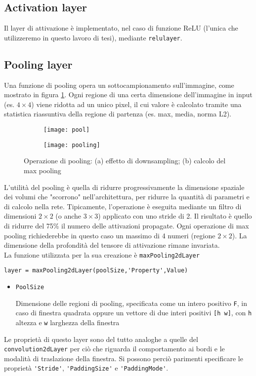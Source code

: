 \subsection{Activation layer}
\label{RELU}
Il layer di attivazione è implementato, nel caso di funzione ReLU (l'unica che utilizzeremo in questo lavoro di tesi), mediante \verb|relulayer|.

\subsection{Pooling layer}
\label{POOL}
Una funzione di pooling opera un sottocampionamento sull'immagine, come mostrato in figura \ref{fig:pooling}.  Ogni regione di una certa dimensione dell'immagine in input (es. $4\times4$) viene ridotta ad un unico pixel, il cui valore è calcolato tramite una statistica riassuntiva della regione di partenza (es. max, media, norma L2).
\begin{figure}[h!]
\centering
\begin{subfigure}[b]{0.48\textwidth}
\centering
\texttt{[image: pool]}
\caption{}
\end{subfigure}

\begin{subfigure}[b]{0.48\textwidth}
\centering
\texttt{[image: pooling]}
\caption{}
\end{subfigure}
\caption{Operazione di pooling: (a) effetto di downsampling; (b) calcolo del max pooling}
\label{fig:pooling}
\end{figure}

L'utilità del pooling è quella di ridurre progressivamente la dimensione spaziale dei volumi che "scorrono" nell'architettura, per ridurre la quantità di parametri e di calcolo nella rete. Tipicamente, l'operazione è eseguita mediante un filtro di dimensioni $2\times 2$ (o anche $3\times 3$) applicato con uno stride di 2. Il risultato è quello di ridurre del 75\% il numero delle attivazioni propagate. Ogni operazione di max pooling richiederebbe in questo caso un massimo di 4 numeri (regione $2\times 2$). La dimensione della profondità del tensore di attivazione rimane invariata.\\

La funzione utilizzata per la sua creazione è \verb|maxPooling2dLayer|

\begin{verbatim}
layer = maxPooling2dLayer(poolSize,'Property',Value)
\end{verbatim}
\begin{itemize}
	\item \verb|PoolSize|
	
	Dimensione delle regioni di pooling, specificata come un intero positivo \verb|F|, in caso di finestra quadrata oppure un vettore di due interi positivi \verb|[h w]|, con \verb|h| altezza e \verb|w| larghezza della finestra
\end{itemize}
Le proprietà di questo layer sono del tutto analoghe a quelle del  \verb|convolution2dLayer| per ciò che riguarda il comportamento ai bordi e le modalità di traslazione della finestra. Si possono perciò parimenti specificare le proprietà \verb|'Stride'|, \verb|'PaddingSize'| e \verb|'PaddingMode'|.

